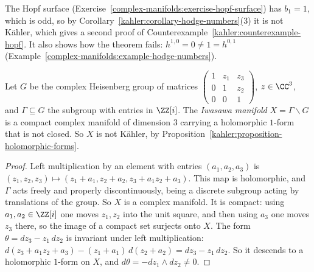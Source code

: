 \begin{counterexample}\label{kahler:counterexample-hopf-hodge-decomposition}
The Hopf surface (Exercise~\ref{complex-manifolds:exercise-hopf-surface}) has $b_1 = 1$, which is odd, so by
Corollary~\ref{kahler:corollary-hodge-numbers}(3) it is not K\"ahler, which gives a second proof of
Counterexample~\ref{kahler:counterexample-hopf}. It also shows how the theorem fails: $h^{1,0} = 0 \neq 1 = h^{0,1}$
(Example~\ref{complex-manifolds:example-hodge-numbers}).
\end{counterexample}

\begin{counterexample}\label{kahler:counterexample-iwasawa}
Let $G$ be the complex Heisenberg group of matrices
$\left(\begin{smallmatrix}1 & z_1 & z_3 \\ 0 & 1 & z_2 \\ 0 & 0 & 1\end{smallmatrix}\right)$, $z \in \CC^3$, and $\Gamma \subseteq G$ the
subgroup with entries in $\ZZ[i]$. The \emph{Iwasawa manifold} $X = \Gamma\backslash G$ is a compact complex manifold of dimension $3$ carrying
a holomorphic $1$-form that is not closed. So $X$ is not K\"ahler, by Proposition~\ref{kahler:proposition-holomorphic-forms}.
\end{counterexample}

\begin{proof}
Left multiplication by an element with entries $(a_1, a_2, a_3)$ is
$(z_1, z_2, z_3) \mapsto (z_1 + a_1, z_2 + a_2, z_3 + a_1z_2 + a_3)$. This map is holomorphic, and $\Gamma$ acts freely and properly
discontinuously, being a discrete subgroup acting by translations of the group. So $X$ is a complex manifold. It is compact: using
$a_1, a_2 \in \ZZ[i]$ one moves $z_1, z_2$ into the unit square, and then using $a_3$ one moves $z_3$ there, so the image of a compact
set surjects onto $X$. The form $\theta = dz_3 - z_1\,dz_2$ is invariant under left multiplication:
$d(z_3 + a_1z_2 + a_3) - (z_1 + a_1)\,d(z_2 + a_2) = dz_3 - z_1\,dz_2$. So it descends to a holomorphic $1$-form on $X$, and
$d\theta = -dz_1 \wedge dz_2 \neq 0$.
\end{proof}

